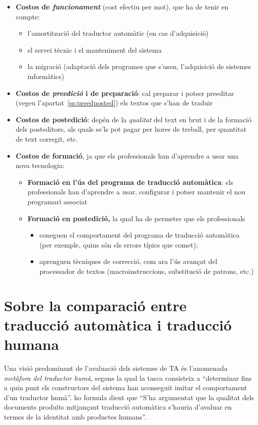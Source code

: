   \begin{itemize}
  \item \textbf{Costos de \emph{funcionament}} (cost efectiu per mot),
    que ha de tenir en compte:
    \begin{itemize}
    \item l'amortització del traductor automàtic (en cas d'adquisició)
    \item el servei tècnic i el manteniment del sistema
    \item la migració (adaptació dels programes que s'usen,
      l'adquisició de sistemes informàtics)
    \end{itemize}

  \item \textbf{Costos de \emph{preedició} i de preparació}: cal
    preparar i potser preeditar (vegeu l'apartat~\ref{ss:preedposted})
    els textos que s'han de traduir

  \item \textbf{Costos de postedició}: depén de la \emph{qualitat} del
    text en brut i de la formació dels posteditors, als quals se'ls
    pot pagar per hores de treball, per quantitat de text corregit,
    etc.

  \item \textbf{Costos de formació}, ja que els professionals han
    d'aprendre a usar una nova tecnologia:
    \begin{itemize}
    \item \textbf{Formació en l'ús del programa de traducció
        automàtica}: els professionals han d'aprendre a usar,
      configurar i potser mantenir el nou programari associat
    \item \textbf{Formació en postedició,} la qual ha de permetre que
      els professionals
      \begin{itemize}
      \item coneguen el comportament del programa de traducció
        automàtica (per exemple, quins són els errors típics que
        comet);
      \item aprenguen tècniques de correcció, com ara l'ús avançat del
        processador de textos (macroinstruccions, substitució de
        patrons, etc.)
      \end{itemize}
    \end{itemize}
  \end{itemize}


\section[Traducció automàtica i traducció humana]{Sobre la comparació entre traducció auto\-mà\-tica i
  traducció humana} 
\label{ss:humaut}
Una visió predominant de l'avaluació dels sistemes de TA és
l'anomenada \emph{metàfora del traductor humà}, segons la qual
\citep{krauwer93j} la tasca consisteix a ``determinar fins a quin punt
els constructors del sistema han aconseguit imitar el comportament
d'un traductor humà''. \citet[p.~262]{sager93b} ho formula dient que ``S'ha
argumentat que la qualitat dels documents produïts mitjançant
traducció automàtica s'hauria d'avaluar en termes de la identitat amb
productes humans''.
  
